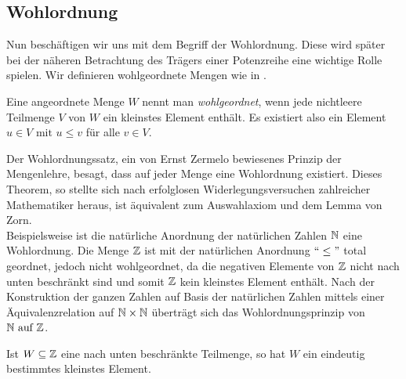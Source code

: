 \subsection{Wohlordnung}
Nun beschäftigen wir uns mit dem Begriff der Wohlordnung. Diese wird später bei der näheren Betrachtung des Trägers einer Potenzreihe eine wichtige Rolle spielen. Wir definieren wohlgeordnete Mengen wie in \cite[S. 16]{fuchs66}.
\begin{defn} \label{wohlgeordn} %
Eine angeordnete Menge $W$ nennt man \textit{wohlgeordnet}, wenn jede nichtleere Teilmenge $V$ von $W$ ein kleinstes Element enthält. Es existiert also ein Element $ u \in V \text{ mit } u \le v $ für alle $ v \in V.$ 
\end{defn}
%
Der Wohlordnungssatz, ein von Ernst Zermelo bewiesenes Prinzip der Mengenlehre, besagt, dass auf jeder Menge eine Wohlordnung existiert. Dieses Theorem, so stellte sich nach erfolglosen Widerlegungsversuchen zahlreicher Mathematiker heraus, ist äquivalent zum Auswahlaxiom und dem Lemma von Zorn. \\
Beispielsweise ist die natürliche Anordnung der natürlichen Zahlen $\mathbb{N}$ eine Wohlordnung. Die Menge $\mathbb{Z}$ ist mit der natürlichen Anordnung $``\leq "$ total geordnet, jedoch nicht wohlgeordnet, da die negativen Elemente von $\mathbb{Z}$ nicht nach unten beschränkt sind und somit $\mathbb{Z}$ kein kleinstes Element enthält. Nach der Konstruktion der ganzen Zahlen auf Basis der natürlichen Zahlen mittels einer Äquivalenzrelation auf $\mathbb{N} \times \mathbb{N}$  überträgt sich das Wohlordnungsprinzip von $\mathbb{N} \text{ auf } \mathbb{Z}$.
\begin{bem} \label{teilmengeGanzeZahlenwohlgeordnet}%
Ist $W \subseteq \mathbb{Z}$ eine nach unten beschränkte Teilmenge, so hat $W$ ein eindeutig bestimmtes kleinstes Element. 
\end{bem} 

